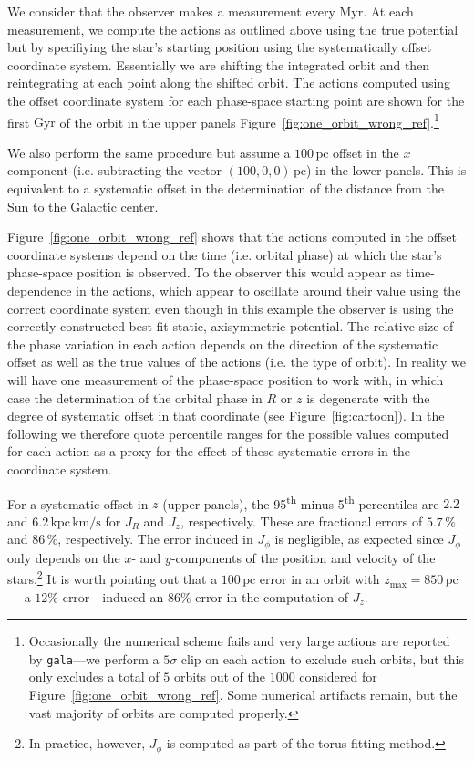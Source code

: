 \documentclass[twocolumn]{aastex62}
\newcommand{\pc}{\text{pc}}
\newcommand{\Myr}{\text{Myr}}
\newcommand{\Gyr}{\text{Gyr}}
\newcommand{\kms}{\text{km}/\text{s}}
\newcommand{\actunit}{\text{kpc}\,\kms}
\begin{document}
We consider that the observer makes a measurement every $\Myr$. At
each measurement, we compute the actions as outlined above using the true
potential but by specifiying the star's starting position using the
systematically offset coordinate system. Essentially we are shifting the
integrated orbit and then reintegrating at each point along the shifted orbit. The actions computed using the offset coordinate system
for each phase-space starting point are shown for the first $\Gyr$ of the
orbit in the upper panels
Figure~\ref{fig:one_orbit_wrong_ref}.\footnote{Occasionally the numerical
scheme fails and very large actions are reported by \texttt{gala}---we perform
a $5\sigma$ clip on each action to exclude such orbits, but this only excludes
a total of $5$ orbits out of the $1000$ considered for
Figure~\ref{fig:one_orbit_wrong_ref}. Some numerical artifacts remain, but the
vast majority of orbits are computed properly.}
    
We also perform the same procedure but assume a $100\,\pc$ offset in the $x$
component (i.e. subtracting the vector $(100, 0, 0)\,\pc$) in the lower
panels. This is equivalent to a systematic offset in the determination of the
distance from the Sun to the Galactic center.

Figure~\ref{fig:one_orbit_wrong_ref} shows that the actions computed in the
offset coordinate systems depend on the time (i.e. orbital phase) at which the
star's phase-space position is observed. To the observer this would
appear as time-dependence in the actions, which appear to oscillate around
their value using the correct coordinate system even though in this example
the observer is using the correctly constructed best-fit static, axisymmetric
potential. The relative size of the phase variation in each action depends on
the direction of the systematic offset as well as the true values of the
actions (i.e. the type of orbit). In reality we will have one measurement of
the phase-space position to work with, in which case the determination of the
orbital phase in $R$ or $z$ is degenerate with the degree of systematic offset
in that coordinate (see Figure~\ref{fig:cartoon}).  In the following we
therefore quote percentile ranges for the possible values computed for each
action as a proxy for the effect of these systematic errors in the coordinate
system.

For a systematic offset in $z$ (upper panels), the 95\textsuperscript{th}
minus 5\textsuperscript{th} percentiles are $2.2$ and $6.2\,\actunit$ for
$J_R$ and $J_z$, respectively. These are fractional errors of $5.7\,\%$ and
$86\,\%$, respectively. The error induced in $J_{\phi}$ is negligible, as
expected since $J_{\phi}$ only depends on the $x$- and $y$-components of the
position and velocity of the stars.\footnote{In practice, however, $J_{\phi}$
is computed as part of the torus-fitting method.} It is worth pointing out
that a $100\,\pc$ error in an orbit with $z_{\text{max}}=850\,\pc$ --- a
$12\%$ error---induced an $86\%$ error in the computation of $J_z$.
\end{document}
